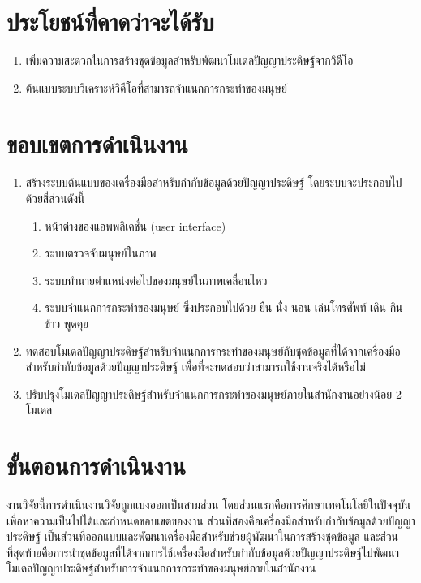 
\section{ประโยชน์ที่คาดว่าจะได้รับ}
\begin{enumerate}
	\setlength\itemsep{-0.25em}
	\item เพิ่มความสะดวกในการสร้างชุดข้อมูลสำหรับพัฒนาโมเดลปัญญาประดิษฐ์จากวิดีโอ
	\item ต้นแบบระบบวิเคราะห์วิดีโอที่สามารถจำแนกการกระทำของมนุษย์
\end{enumerate}
\clearpage

\section{ขอบเขตการดำเนินงาน}
\begin{enumerate}
	\setlength\itemsep{-0.25em}
	\item สร้างระบบต้นแบบของเครื่องมือสำหรับกำกับข้อมูลด้วยปัญญาประดิษฐ์ โดยระบบจะประกอบไปด้วยสี่ส่วนดังนี้
	\begin{enumerate}
		\setlength\itemsep{-0.25em}
		\item หน้าต่างของแอพพลิเคชั่น (user interface)
		\item ระบบตรวจจับมนุษย์ในภาพ
		\item ระบบทำนายตำแหน่งต่อไปของมนุษย์ในภาพเคลื่อนไหว
		\item ระบบจำแนกการกระทำของมนุษย์ ซึ่งประกอบไปด้วย ยืน นั่ง นอน เล่นโทรศัพท์ เดิน กินข้าว พูดคุย
	\end{enumerate}
	\item ทดสอบโมเดลปัญญาประดิษฐ์สำหรับจำแนกการกระทำของมนุษย์กับชุดข้อมูลที่ได้จากเครื่องมือสำหรับกำกับข้อมูลด้วยปัญญาประดิษฐ์ เพื่อที่จะทดสอบว่าสามารถใช้งานจริงได้หรือไม่
	\item ปรับปรุงโมเดลปัญญาประดิษฐ์สำหรับจำแนกการกระทำของมนุษย์ภายในสำนักงานอย่างน้อย 2 โมเดล
\end{enumerate}

\section{ขั้นตอนการดำเนินงาน}
งานวิจัยนี้การดำเนินงานวิจัยถูกแบ่งออกเป็นสามส่วน โดยส่วนแรกคือการศึกษาเทคโนโลยีในปัจจุบันเพื่อหาความเป็นไปได้และกำหนดขอบเขตของงาน 
ส่วนที่สองคือเครื่องมือสำหรับกำกับข้อมูลด้วยปัญญาประดิษฐ์ เป็นส่วนที่ออกแบบและพัฒนาเครื่องมือสำหรับช่วยผู้พัฒนาในการสร้างชุดข้อมูล 
และส่วนที่สุดท้ายคือการนำชุดข้อมูลที่ได้จากการใช้เครื่องมือสำหรับกำกับข้อมูลด้วยปัญญาประดิษฐ์ไปพัฒนาโมเดลปัญญาประดิษฐ์สำหรับการจำแนกการกระทำของมนุษย์ภายในสำนักงาน
